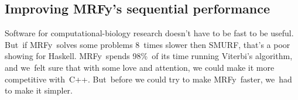 \documentclass[]{jfp1}
\newcommand\mrfy{MRFy} %
\newcommand\seclabel[1]{\label{sec:#1}}
\begin{document}


%


\subsection{Improving \mrfy's sequential performance}

\seclabel{better-viterbi}
\seclabel{improving-viterbi}

Software for
computational-biology research doesn't have to be fast to be useful.
But~if \mrfy\ solves some problems 8~times slower then
SMURF, that's a poor showing for Haskell.
\mrfy\ spends 98\%\ of its time running Viterbi's algorithm, and
we~felt sure that with some love and attention, we could make it
more competitive with~C++.
But~before we could try to make \mrfy\ faster, we~had to make it simpler.
\end{document}
